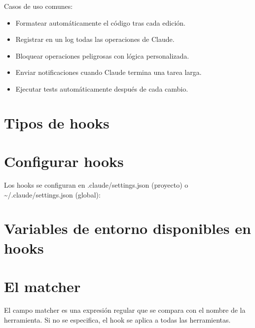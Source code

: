 \documentclass[11pt,a4paper]{book}
\begin{document}
Casos de uso comunes:

\begin{itemize}\item Formatear automáticamente el código tras cada edición.\end{itemize}
\begin{itemize}\item Registrar en un log todas las operaciones de Claude.\end{itemize}
\begin{itemize}\item Bloquear operaciones peligrosas con lógica personalizada.\end{itemize}
\begin{itemize}\item Enviar notificaciones cuando Claude termina una tarea larga.\end{itemize}
\begin{itemize}\item Ejecutar tests automáticamente después de cada cambio.\end{itemize}
\section{Tipos de hooks}
\section{Configurar hooks}
Los hooks se configuran en .claude/settings.json (proyecto) o \textasciitilde{}/.claude/settings.json (global):

\section{Variables de entorno disponibles en hooks}
\section{El matcher}
El campo matcher es una expresión regular que se compara con el nombre de la herramienta. Si no se especifica, el hook se aplica a todas las herramientas.
\end{document}
